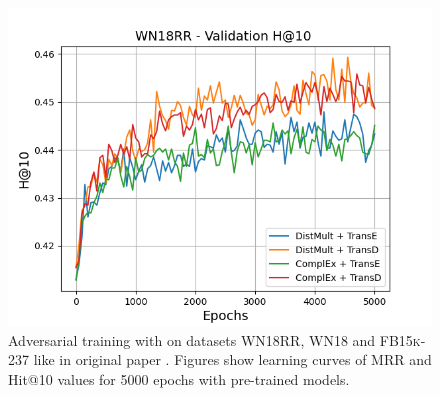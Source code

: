 \begin{figure}
\begin{minipage}{.3\textwidth}
      \includegraphics[width=0.9\linewidth]{figures/results/gan_train/pretrained/uncertainty/max_distribution/entropy/wn18rr/5k_epochs/uncertainty_wn18rr_hit10.png}
    \end{minipage}%
    \caption{Adversarial training with \ussoftmax on datasets \textsc{WN18RR}, \textsc{WN18} and \textsc{FB15k-237} like in original \kbgan paper \cite{cai2017kbgan}.
    Figures show learning curves of MRR and Hit@10 values for 5000 epochs with pre-trained models.}
    \label{fig:gan_train_pretrained_max_distribution}
\end{figure}